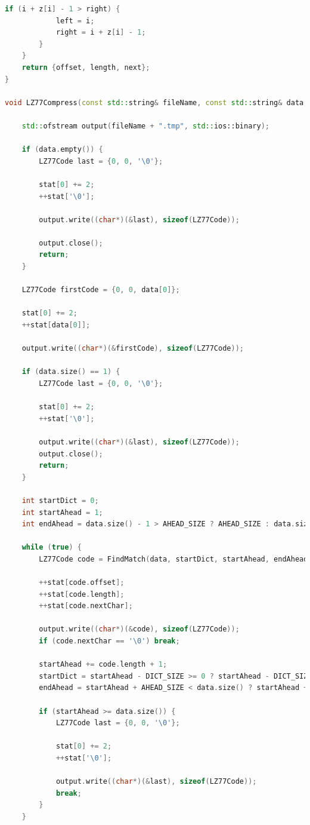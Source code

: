 \documentclass[14pt]{article}
\begin{document}
\begin{lstlisting}[language=C++]
        if (i + z[i] - 1 > right) {
            left = i;
            right = i + z[i] - 1;
        }
    }
    return {offset, length, next};
}

void LZ77Compress(const std::string& fileName, const std::string& data, std::unordered_map<char, int>& stat) {

    std::ofstream output(fileName + ".tmp", std::ios::binary);

    if (data.empty()) {
        LZ77Code last = {0, 0, '\0'};

        stat[0] += 2; 
        ++stat['\0'];

        output.write((char*)(&last), sizeof(LZ77Code));  

        output.close();
        return;
    }

    LZ77Code firstCode = {0, 0, data[0]};

    stat[0] += 2; 
    ++stat[data[0]];

    output.write((char*)(&firstCode), sizeof(LZ77Code));

    if (data.size() == 1) {
        LZ77Code last = {0, 0, '\0'};

        stat[0] += 2; 
        ++stat['\0'];

        output.write((char*)(&last), sizeof(LZ77Code));  
        output.close();
        return;
    }

    int startDict = 0;
    int startAhead = 1;
    int endAhead = data.size() - 1 > AHEAD_SIZE ? AHEAD_SIZE : data.size() - 1; 

    while (true) {
        LZ77Code code = FindMatch(data, startDict, startAhead, endAhead);
        
        ++stat[code.offset];
        ++stat[code.length]; 
        ++stat[code.nextChar];

        output.write((char*)(&code), sizeof(LZ77Code));
        if (code.nextChar == '\0') break;

        startAhead += code.length + 1;
        startDict = startAhead - DICT_SIZE >= 0 ? startAhead - DICT_SIZE : 0;
        endAhead = startAhead + AHEAD_SIZE < data.size() ? startAhead + AHEAD_SIZE - 1 : data.size() - 1;

        if (startAhead >= data.size()) {
            LZ77Code last = {0, 0, '\0'};

            stat[0] += 2; 
            ++stat['\0'];

            output.write((char*)(&last), sizeof(LZ77Code));            
            break;
        }
    }


\end{lstlisting}
\end{document}
